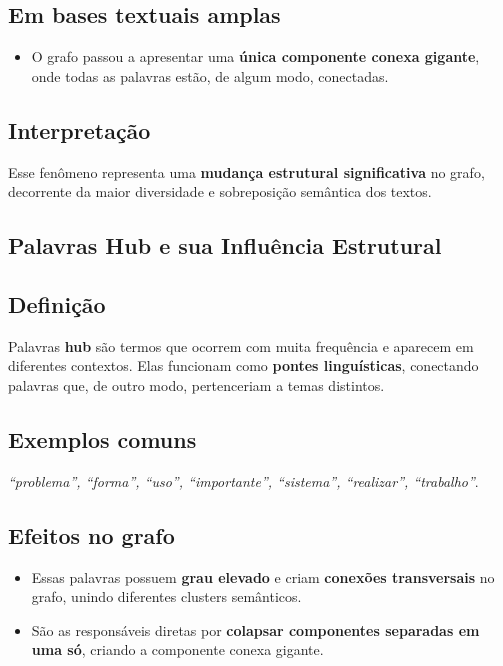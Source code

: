 \documentclass[12pt]{article}
\begin{document}
\subsection*{Em bases textuais amplas}
\begin{itemize}
    \item O grafo passou a apresentar uma \textbf{única componente conexa gigante}, onde todas as palavras estão, de algum modo, conectadas.
\end{itemize}

\subsection*{Interpretação}
Esse fenômeno representa uma \textbf{mudança estrutural significativa} no grafo, decorrente da maior diversidade e sobreposição semântica dos textos.

\subsection{Palavras Hub e sua Influência Estrutural}

\subsection*{Definição}
Palavras \textbf{hub} são termos que ocorrem com muita frequência e aparecem em diferentes contextos. Elas funcionam como \textbf{pontes linguísticas}, conectando palavras que, de outro modo, pertenceriam a temas distintos.

\subsection*{Exemplos comuns}
\textit{``problema'', ``forma'', ``uso'', ``importante'', ``sistema'', ``realizar'', ``trabalho''}.

\subsection*{Efeitos no grafo}
\begin{itemize}
    \item Essas palavras possuem \textbf{grau elevado} e criam \textbf{conexões transversais} no grafo, unindo diferentes clusters semânticos.
    \item São as responsáveis diretas por \textbf{colapsar componentes separadas em uma só}, criando a componente conexa gigante.
\end{itemize}
\end{document}
